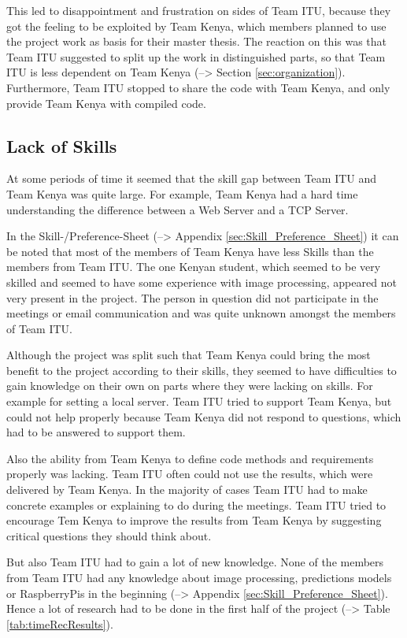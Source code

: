 This led to disappointment and frustration on sides of Team ITU, because they got the feeling to be exploited by Team Kenya, which members planned to use the project work as basis for their master thesis. The reaction on this was that Team ITU suggested to split up the work in distinguished parts, so that Team ITU is less dependent on Team Kenya (--> Section \ref{sec:organization}). Furthermore, Team ITU stopped to share the code with Team Kenya, and only provide Team Kenya with compiled code.


\subsection{Lack of Skills}
At some periods of time it seemed that the skill gap between Team ITU and Team Kenya was quite large. For example, Team Kenya had a hard time understanding the difference between a Web Server and a TCP Server.

In the Skill-/Preference-Sheet (--> Appendix \ref{sec:Skill_Preference_Sheet}) it can be noted that most of the members of Team Kenya have less Skills than the members from Team ITU. The one Kenyan student, which seemed to be very skilled and seemed to have some experience with image processing, appeared not very present in the project. The person in question did not participate in the meetings or email communication and was quite unknown amongst the members of Team ITU.

Although the project was split such that Team Kenya could bring the most benefit to the project according to their skills, they seemed to have difficulties to gain knowledge on their own on parts where they were lacking on skills. For example for setting a local server. Team ITU tried to support Team Kenya, but could not help properly because Team Kenya did not respond to questions, which had to be answered to support them. 

Also the ability from Team Kenya to define code methods and requirements properly was lacking. Team ITU often could not use the results, which were delivered by Team Kenya. In the majority of cases Team ITU had to make concrete examples or explaining to do during the meetings. Team ITU tried to encourage Tem Kenya to improve the results from Team Kenya by suggesting critical questions they should think about.

But also Team ITU had to gain a lot of new knowledge. None of the members from Team ITU had any knowledge about image processing, predictions models or RaspberryPis in the beginning (--> Appendix \ref{sec:Skill_Preference_Sheet}). Hence a lot of research had to be done in the first half of the project (--> Table \ref{tab:timeRecResults}).


